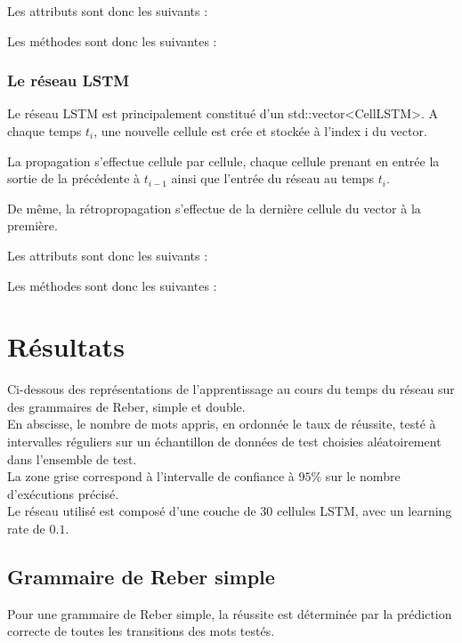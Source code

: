 \bigskip

Les attributs sont donc les suivants :


Les méthodes sont donc les suivantes :


\subsubsection{Le réseau LSTM}

Le réseau LSTM est principalement constitué d'un std::vector<CellLSTM>.
A chaque temps $t_i$, une nouvelle cellule est crée et stockée à l'index i du
vector.

\medskip

La propagation s'effectue cellule par cellule, chaque cellule prenant en entrée
la sortie de la précédente à $t_{i-1}$ ainsi que l'entrée du réseau au temps
$t_i$.

\medskip

De même, la rétropropagation s'effectue de la dernière cellule du vector à
la première.

\bigskip

Les attributs sont donc les suivants :


\bigskip

Les méthodes sont donc les suivantes :


\section{Résultats}
Ci-dessous des représentations de l'apprentissage au cours du temps du réseau sur des
grammaires de Reber, simple et double. \\
En abscisse, le nombre de mots appris, en ordonnée le taux de réussite, testé à
intervalles réguliers sur un échantillon de données de test choisies aléatoirement
dans l'ensemble de test. \\
La zone grise correspond à l'intervalle de confiance à $95\%$ sur le nombre d'exécutions
précisé.\\
Le réseau utilisé est composé d'une couche de 30 cellules LSTM, avec un learning
rate de $0.1$.

\subsection{Grammaire de Reber simple}
Pour une grammaire de Reber simple, la réussite est déterminée par la prédiction
correcte de toutes les transitions des mots testés.

